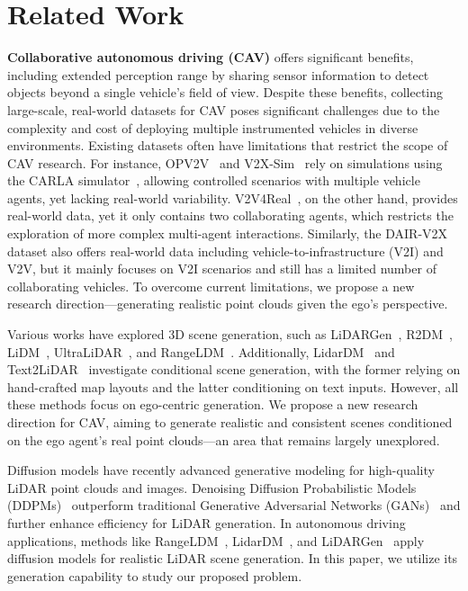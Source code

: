 \section{Related Work}
\label{sec:related}
\textbf{Collaborative autonomous driving (CAV)} offers significant benefits, including extended perception range by sharing sensor information to detect objects beyond a single vehicle's field of view.
Despite these benefits, collecting large-scale, real-world datasets for CAV poses significant challenges due to the complexity and cost of deploying multiple instrumented vehicles in diverse environments. Existing datasets often have limitations that restrict the scope of CAV research. For instance, OPV2V~\cite{xu2022opv2v} and V2X-Sim~\cite{li2022v2xsim} rely on simulations using the CARLA simulator~\citep{Dosovitskiy17carla}, allowing controlled scenarios with multiple vehicle agents, yet lacking real-world variability. V2V4Real~\cite{xu2023v2v4real}, on the other hand, provides real-world data, yet it only contains two collaborating agents, which restricts the exploration of more complex multi-agent interactions. Similarly, the DAIR-V2X~\cite{dair-v2x} dataset also offers real-world data including vehicle-to-infrastructure (V2I) and V2V, but it mainly focuses on V2I scenarios and still has a limited number of collaborating vehicles. To overcome current limitations, we propose a new research direction---generating realistic point clouds given the ego's perspective. 

 Various works have explored 3D scene generation, such as LiDARGen~\cite{zyrianov2022learning-lidargen}, R2DM~\cite{nakashima2024lidar-r2dm}, LiDM~\cite{ran2024towards}, UltraLiDAR~\citep{xiong2023learning}, and RangeLDM~\cite{hu2025rangeldm}. Additionally, LidarDM~\cite{zyrianov2024lidardm} and Text2LiDAR~\cite{wu2024text2lidar} investigate conditional scene generation, with the former relying on hand-crafted map layouts and the latter conditioning on text inputs. However, all these methods focus on ego-centric generation. We propose a new research direction for CAV, aiming to generate realistic and consistent scenes conditioned on the ego agent's real point clouds---an area that remains largely unexplored.



Diffusion models have recently advanced generative modeling for high-quality LiDAR point clouds and images. Denoising Diffusion Probabilistic Models (DDPMs)~\cite{ho2020denoising} outperform traditional Generative Adversarial Networks (GANs)~\cite{goodfellow2014generative} and further enhance efficiency for LiDAR generation. In autonomous driving applications, methods like RangeLDM~\cite{hu2025rangeldm}, LidarDM~\cite{zyrianov2024lidardm}, and LiDARGen~\cite{zyrianov2022learning-lidargen} apply diffusion models for realistic LiDAR scene generation. In this paper, we utilize its generation capability to study our proposed problem.
